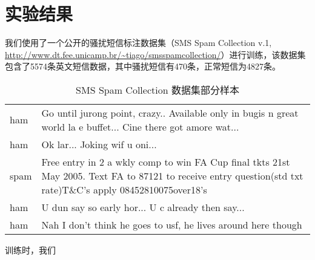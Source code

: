\documentclass[a4paper, twocolumn, 12pt]{article}
\begin{document}
\section{实验结果}
我们使用了一个公开的骚扰短信标注数据集（SMS Spam Collection v.1, \url{http://www.dt.fee.unicamp.br/~tiago/smsspamcollection/}）进行训练，该数据集包含了5574条英文短信数据，其中骚扰短信有470条，正常短信为4827条。\\
[2ex]
\begin{table*}[htp]
\centering
\caption{SMS Spam Collection 数据集部分样本}
\begin{tabular}{lp{14cm}}
    \hline
    ham&	Go until jurong point, crazy.. Available only in bugis n great world la e buffet... Cine there got amore wat...\\
    ham&	Ok lar... Joking wif u oni...\\
    spam&	Free entry in 2 a wkly comp to win FA Cup final tkts 21st May 2005. Text FA to 87121 to receive entry question(std txt rate)T\&C's apply 08452810075over18's\\
    ham&	U dun say so early hor... U c already then say...\\
    ham&	Nah I don't think he goes to usf, he lives around here though\\
    \hline
\end{tabular}
\end{table*}
训练时，我们
\end{document}
